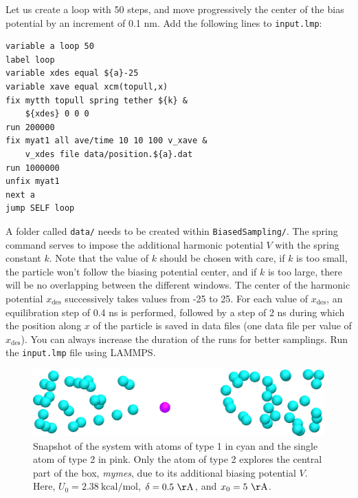 \documentclass[9pt,tutorial]{livecoms}
\newcommand{\flrcmd}[1]{\textcolor{command}{\texttt{#1}}} %
\newcommand{\flecmd}[1]{\textcolor{command}{\texttt{#1}}} %
\begin{document}
Let us create a loop with 50 steps, and move progressively the center of the
bias potential by an increment of 0.1 nm. Add the following lines to \flecmd{input.lmp}:
\begin{lstlisting}
variable a loop 50
label loop
variable xdes equal ${a}-25
variable xave equal xcm(topull,x)
fix mytth topull spring tether ${k} &
    ${xdes} 0 0 0
run 200000
fix myat1 all ave/time 10 10 100 v_xave &
    v_xdes file data/position.${a}.dat
run 1000000
unfix myat1
next a
jump SELF loop
\end{lstlisting}
A folder called \flrcmd{data/} needs to be created within \flrcmd{BiasedSampling/}.
The spring command serves to impose the additional harmonic potential $V$ with
the spring constant $k$. Note that the value of $k$ should be chosen with care,
if $k$ is too small, the particle won't follow the biasing potential center,
and if $k$ is too large, there will be no overlapping between the different windows.
The center of the harmonic potential $x_\text{des}$ successively takes values
from -25 to 25. For each value of $x_\text{des}$, an equilibration step of 0.4 ns
is performed, followed by a step of 2 ns during which the position along $x$ of
the particle is saved in data files (one data file per value of $x_\text{des}$).
You can always increase the duration of the runs for better samplings. Run the
\flecmd{input.lmp}  file using LAMMPS.

\begin{figure}
\centering
\includegraphics[width=\linewidth]{US-system-biased}
\caption{Snapshot of the system with atoms of type 1 in cyan and the single atom
of type 2 in pink. Only the atom of type 2 explores the central part of the box,
\textit{mymes}, due to its additional biasing potential $V$. Here,
$U_0 = 2.38~\text{kcal/mol}$, $\delta = 0.5~\mathrm{\AA{}}$, and $x_0 = 5~\mathrm{\AA{}}$.}
\label{fig:US-system-biased}
\end{figure}
\end{document}
